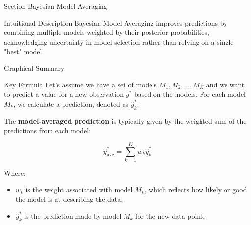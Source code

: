 
\begin{frame}{Section}
\centering
\Huge{Bayesian Model Averaging}
\end{frame}


\begin{frame}{Intuitional Description}
Bayesian Model Averaging improves predictions by combining multiple models weighted by their posterior probabilities, acknowledging uncertainty in model selection rather than relying on a single "best" model.
\end{frame}

\begin{frame}{Graphical Summary}

\end{frame}


\begin{frame}{Key Formula}
Let’s assume we have a set of models $M_1, M_2, \dots, M_K$ and we want to predict a value for a new observation $y^*$ based on the models. For each model $M_k$, we calculate a prediction, denoted as $\hat{y}^*_k$. 

The \textbf{model-averaged prediction} is typically given by the weighted sum of the predictions from each model:

$$
\hat{y}^*_{\text{avg}} = \sum_{k=1}^{K} w_k \hat{y}^*_k
$$

Where:
\begin{itemize}
\item $w_k$ is the weight associated with model $M_k$, which reflects how likely or good the model is at describing the data.
\item $\hat{y}^*_k$ is the prediction made by model $M_k$ for the new data point.
\end{itemize}

\end{frame}


